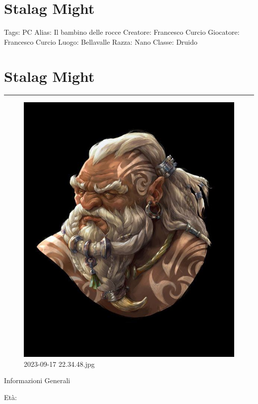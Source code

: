 \section{Stalag Might}\label{stalag-might}

Tags: PC Alias: Il bambino delle rocce Creatore: Francesco Curcio
Giocatore: Francesco Curcio Luogo: Bellavalle Razza: Nano Classe: Druido

\section{Stalag Might}\label{stalag-might-1}

\begin{center}\rule{0.5\linewidth}{0.5pt}\end{center}

\begin{figure}
\centering
\includegraphics{2023-09-17_22.34.48.jpg}
\caption{2023-09-17 22.34.48.jpg}
\end{figure}

Informazioni Generali

Età:


